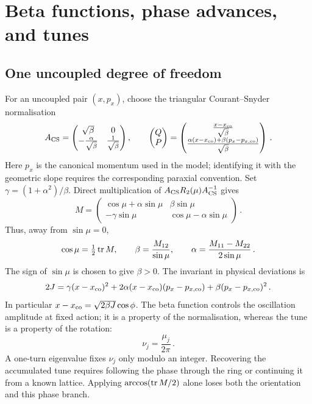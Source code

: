 \section{Beta functions, phase advances, and tunes}
\label{sec:lnf-beta-tune}

\subsection{One uncoupled degree of freedom}

For an uncoupled pair $(x,p_x)$, choose the triangular Courant--Snyder
normalisation
\begin{equation}\label{eq:lnf-courant-snyder}
    A_{\rm CS} = \begin{pmatrix}
        \sqrt{\beta} & 0 \\
        -\frac{\alpha}{\sqrt{\beta}} & \frac{1}{\sqrt{\beta}}
    \end{pmatrix},\qquad
    \begin{pmatrix}
        Q\\P
    \end{pmatrix} = \begin{pmatrix}
        \frac{x-x_{\rm co}}{\sqrt{\beta}} \\
        \frac{\alpha(x-x_{\rm co}) + \beta(p_x-p_{x,\rm co})}{\sqrt{\beta}}
    \end{pmatrix}\,.
\end{equation}
Here $p_x$ is the canonical momentum used in the model; identifying it
with the geometric slope requires the corresponding paraxial convention.
Set $\gamma = (1 + \alpha^2)/\beta$. Direct multiplication of
$A_{\rm CS}R_2(\mu)A_{\rm CS}^{-1}$ gives
\begin{equation}\label{eq:lnf-twiss-matrix}
    M = \begin{pmatrix}
    \cos\mu + \alpha\sin\mu&\beta\sin\mu\\
    -\gamma\sin\mu&\cos\mu-\alpha\sin\mu
    \end{pmatrix}\,.
\end{equation}
Thus, away from $\sin\mu = 0$,
\begin{equation}
    \cos\mu = \tfrac12\operatorname{tr} M,\qquad
    \beta = \frac{M_{12}}{\sin\mu},\qquad
    \alpha = \frac{M_{11}-M_{22}}{2\sin\mu}\,.
\end{equation}
The sign of $\sin\mu$ is chosen to give $\beta>0$.
The invariant in physical deviations is
\begin{equation}\label{eq:lnf-cs-invariant}
    2J = \gamma(x-x_{\rm co})^2 + 2\alpha(x-x_{\rm co})(p_x-p_{x,\rm co}) + \beta(p_x-p_{x,\rm co})^2\,.
\end{equation}
In particular $x-x_{\rm co} = \sqrt{2\beta J}\cos\phi$.
The beta function controls the oscillation amplitude at fixed action;
it is a property of the normalisation, whereas the tune is a property
of the rotation:
\begin{equation}\label{eq:lnf-tune}
    \nu_j = \frac{\mu_j}{2\pi}\,.
\end{equation}
A one-turn eigenvalue fixes $\nu_j$ only modulo an integer. Recovering
the accumulated tune requires following the phase through the ring or
continuing it from a known lattice. Applying $\arccos(\operatorname{tr} M/2)$ alone
loses both the orientation and this phase branch.



